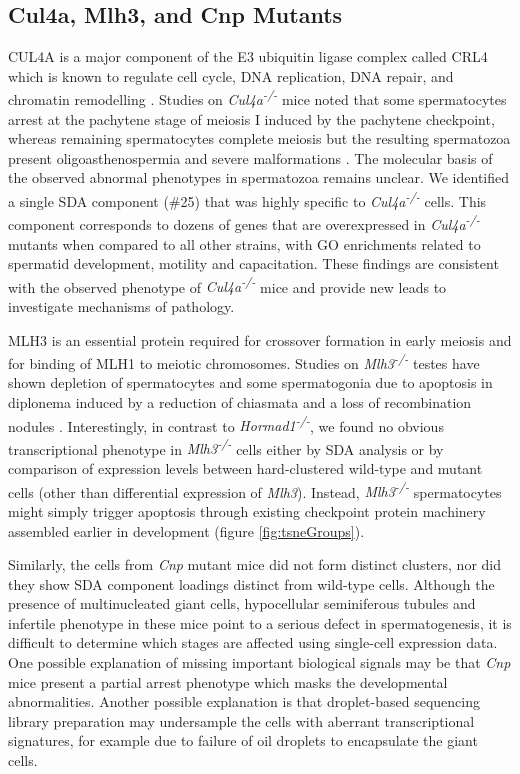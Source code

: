 \subsection{Cul4a, Mlh3, and Cnp Mutants}
CUL4A is a major component of the E3 ubiquitin ligase complex called CRL4 which is known to regulate cell cycle, DNA replication, DNA repair, and chromatin remodelling \parencite{Dubiel2018Cullin}.
Studies on \textit{Cul4a\textsuperscript{-/-}} mice noted that some spermatocytes arrest at the pachytene stage of meiosis I induced by the pachytene checkpoint, whereas remaining spermatocytes complete meiosis but the resulting spermatozoa present oligoasthenospermia and severe malformations \parencite{Yin2011E3}.
The molecular basis of the observed abnormal phenotypes in spermatozoa remains unclear.
We identified a single SDA component (\#25) that was highly specific to \textit{Cul4a\textsuperscript{-/-}} cells.
This component corresponds to dozens of genes that are overexpressed in \textit{Cul4a\textsuperscript{-/-}} mutants when compared to all other strains, with GO enrichments related to spermatid development, motility and capacitation.
These findings are consistent with the observed phenotype of \textit{Cul4a\textsuperscript{-/-}} mice and provide new leads to investigate mechanisms of pathology.

MLH3 is an essential protein required for crossover formation in early meiosis and for binding of MLH1 to meiotic chromosomes.
Studies on \textit{Mlh3\textsuperscript{-/-}} testes have shown depletion of spermatocytes and some spermatogonia due to apoptosis in diplonema induced by a reduction of chiasmata and a loss of recombination nodules \parencite{Lipkin2002Meiotic}.
Interestingly, in contrast to \textit{Hormad1\textsuperscript{-/-}}, we found no obvious transcriptional phenotype in \textit{Mlh3\textsuperscript{-/-}} cells either by SDA analysis or by comparison of expression levels between hard-clustered wild-type and mutant cells (other than differential expression of \textit{Mlh3}).
Instead, \textit{Mlh3\textsuperscript{-/-}} spermatocytes might simply trigger apoptosis through existing checkpoint protein machinery assembled earlier in development (figure \ref{fig:tsneGroups}).

Similarly, the cells from \textit{Cnp} mutant mice did not form distinct clusters, nor did they show SDA component loadings distinct from wild-type cells.
Although the presence of multinucleated giant cells, hypocellular seminiferous tubules and infertile phenotype in these mice point to a serious defect in spermatogenesis, it is difficult to determine which stages are affected using single-cell expression data.
One possible explanation of missing important biological signals may be that \textit{Cnp} mice present a partial arrest phenotype which masks the developmental abnormalities.
Another possible explanation is that droplet-based sequencing library preparation may undersample the cells with aberrant transcriptional signatures, for example due to failure of oil droplets to encapsulate the giant cells.

